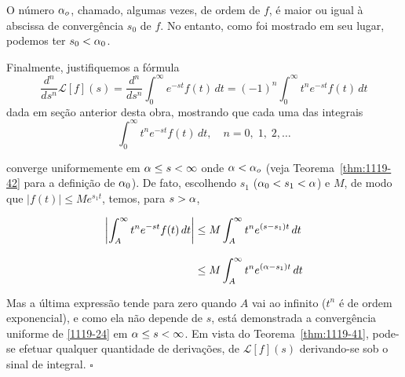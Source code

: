 \begin{obs} O número $\alpha_o$, chamado, algumas vezes, de ordem de $f$, é
maior ou igual à abscissa de convergência $s_{0}$ de $f$. No
entanto, como foi mostrado em seu lugar, podemos ter $s_{0}<\alpha_{0}$.
\end{obs}

Finalmente, justifiquemos a fórmula
\begin{equation*}
  \dfrac{d^n}{ds^n}\mathcal{L}[f](s)=\dfrac{d^n}{ds^n}\int_0^\infty e^{-st}f(t)\, dt
  =(-1)^n\int_0^\infty t^ne^{-st}f(t)\,dt
\end{equation*}
 dada em seção anterior desta obra, mostrando que cada uma das integrais
\begin{equation}\label{1119-24}
  \int_0^\infty t^ne^{-st}f(t)\, dt,\quad n = 0,\; 1,\; 2,\ldots
\end{equation}

converge uniformemente em $\alpha \leq  s < \infty$ onde $\alpha <
\alpha_o$ (veja Teorema~\ref{thm:1119-42} para a definição de $\alpha_{0}$).
De fato, escolhendo $s_1$ ($\alpha_{0} < s_1 < \alpha$) e $M$, de modo que
$|f(t)|\leq Me^{s_1t}$, temos, para $s> \alpha$,

\begin{align*}
\left|\int_A^\infty t^n e^{-st}f(t)\, dt \right| &\leq M\int_A^\infty t^n e^{(s-s_1)t}\, dt\\[2ex]
&\leq M\int_A^\infty t^n e^{(\alpha-s_1)t}\, dt
\end{align*}


Mas a última expressão tende para zero quando $A$ vai ao infinito
($t^n$ é de ordem exponencial), e como ela não depende de $s$,
está demonstrada a convergência uniforme de \eqref{1119-24} em
$\alpha \leq s < \infty$. Em vista do Teorema~\ref{thm:1119-41}, pode-se
efetuar qualquer quantidade de derivações, de $\mathcal{L}[f](s)$
derivando-se sob o sinal de integral. \hfill $\square$